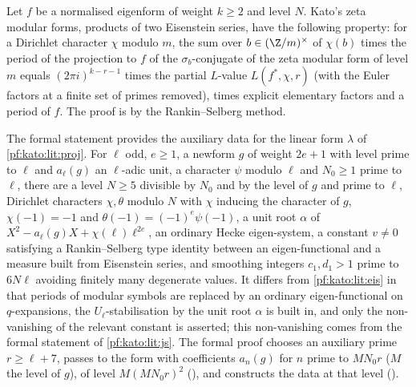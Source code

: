 \begin{littheorem}\label{pf:kato:lit:eis}
Let $f$ be a normalised eigenform of weight $k\ge2$ and level $N$. Kato's zeta modular forms, products of two Eisenstein series, have the
following property: for a Dirichlet character $\chi$ modulo $m$, the sum over $b\in(\Z/m)^\times$ of $\chi(b)$ times the period of the
projection to $f$ of the $\sigma_b$-conjugate of the zeta modular form of level $m$ equals $(2\pi i)^{k-r-1}$ times the partial $L$-value
$L(f^*,\chi,r)$ (with the Euler factors at a finite set of primes removed), times explicit elementary factors and a period of $f$. The proof is
by the Rankin--Selberg method.
\end{littheorem}

\begin{remark}\label{pf:kato:rem:eis}
The formal statement provides the auxiliary data for the linear form $\lambda$ of \cref{pf:kato:lit:proj}. For $\ell$ odd, $e\ge1$, a
newform $g$ of weight $2e+1$ with level prime to $\ell$ and $a_\ell(g)$ an $\ell$-adic unit, a character $\psi$ modulo $\ell$ and $N_0\ge1$ prime
to $\ell$, there are a level $N\ge5$ divisible by $N_0$ and by the level of $g$ and prime to $\ell$, Dirichlet characters $\chi,\theta$
modulo $N$ with $\chi$ inducing the character of $g$, $\chi(-1)=-1$ and $\theta(-1)=(-1)^e\psi(-1)$, a unit root $\alpha$ of
$X^2-a_\ell(g)X+\chi(\ell)\ell^{2e}$, an ordinary Hecke eigen-system, a constant $v\ne0$ satisfying a Rankin--Selberg type identity between
an eigen-functional and a measure built from Eisenstein series, and smoothing integers $c_1,d_1>1$ prime to $6N\ell$ avoiding finitely
many degenerate values. It differs from \cref{pf:kato:lit:eis} in that periods of modular symbols are replaced by an ordinary
eigen-functional on $q$-expansions, the $U_\ell$-stabilisation by the unit root $\alpha$ is built in, and only the non-vanishing of the
relevant constant is asserted; this non-vanishing comes from the formal statement of \cref{pf:kato:lit:js}. The formal proof chooses an
auxiliary prime $r\ge\ell+7$, passes to the form with coefficients $a_n(g)$ for $n$ prime to $MN_0r$ ($M$ the level of $g$), of level
$M(MN_0r)^2$ (), and constructs the data at that level
().
\end{remark}


